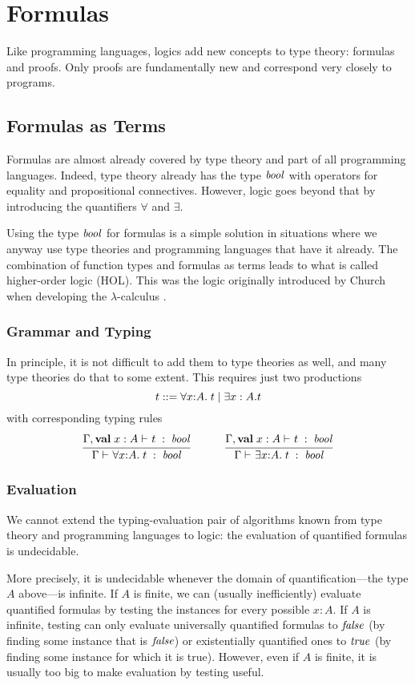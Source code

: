 \section{Formulas}

Like programming languages, logics add new concepts to type theory: formulas and proofs.
Only proofs are fundamentally new and correspond very closely to programs.

\subsection{Formulas as Terms}

Formulas are almost already covered by type theory and part of all programming languages.
Indeed, type theory already has the type $\mathit{bool}$ with operators for equality and propositional connectives.
However, logic goes beyond that by introducing the quantifiers $\forall$ and $\exists$.

Using the type $\mathit{bool}$ for formulas is a simple solution in situations where we anyway use type theories and programming languages that have it already.
The combination of function types and formulas as terms leads to what is called higher-order logic (HOL).
This was the logic originally introduced by Church when developing the $\lambda$-calculus \cite{churchtypes}.

\subsubsection{Grammar and Typing}

In principle, it is not difficult to add them to type theories as well, and many type theories do that to some extent.
This requires just two productions
\[t \bbc \afa[A]{x}{t} \bnfalt \exists x:A.t\]
with corresponding typing rules
\[\rul{\oftype{}{\Gamma,\aval{x}{A}{}}{t}{\Bool}}{\oftype{}{\Gamma}{\afa[A]{x}{t}}{\Bool}}
\tb\tb
\rul{\oftype{}{\Gamma,\aval{x}{A}{}}{t}{\Bool}}{\oftype{}{\Gamma}{\aex[A]{x}{t}}{\Bool}}
\]

\subsubsection{Evaluation}

We cannot extend the typing-evaluation pair of algorithms known from type theory and programming languages to logic: the evaluation of quantified formulas is undecidable.

More precisely, it is undecidable whenever the domain of quantification---the type $A$ above---is infinite.
If $A$ is finite, we can (usually inefficiently) evaluate quantified formulas by testing the instances for every possible $x:A$.
If $A$ is infinite, testing can only evaluate universally quantified formulas to $\mathit{false}$ (by finding some instance that is $\mathit{false}$) or existentially quantified ones to $\mathit{true}$ (by finding some instance for which it is true).
However, even if $A$ is finite, it is usually too big to make evaluation by testing useful.

